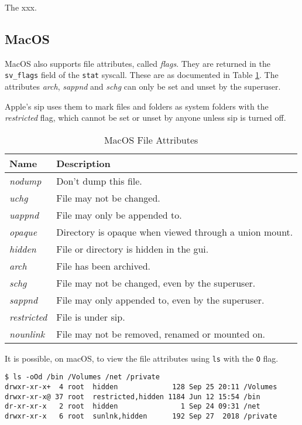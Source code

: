 \documentclass[a4paper]{article}
\begin{document}
The xxx.

\subsection{MacOS}


MacOS also supports file attributes, called \emph{flags}. They are returned in the \verb|sv_flags| field of the \verb|stat| syscall. These are as documented in Table \ref{tbl:macosflags}. The attributes \emph{arch}, \emph{sappnd} and \emph{schg} can only be set and unset by the superuser. 

Apple's \gls{sip} uses them to mark files and folders as system folders with the \emph{restricted} flag, which cannot be set or unset by anyone unless \gls{sip} is turned off.

\begin{table}
\centering\caption{MacOS File Attributes}\label{tbl:macosflags}
\begin{tabular}{@{}lp{10.5cm}@{}}
\toprule
Name & Description\\
\midrule
\emph{nodump} & Don't dump this file.\\
\emph{uchg} & File may not be changed.\\
\emph{uappnd} & File may only be appended to.\\
\emph{opaque} & Directory is opaque when viewed through a union mount.\\
\emph{hidden} & File or directory is hidden in the \gls{gui}.\\
\emph{arch} & File has been archived.\\
\emph{schg} & File may not be changed, even by the superuser.\\
\emph{sappnd} & File may only appended to, even by the superuser.\\
\emph{restricted} & File is under \gls{sip}.\\
\emph{nounlink} & File may not be removed, renamed or mounted on.\\
\bottomrule  
\end{tabular}
\end{table}
It is possible, on macOS, to view the file attributes using \verb|ls| with the \verb|O| flag. 

\begin{verbatim}
$ ls -oOd /bin /Volumes /net /private
drwxr-xr-x+  4 root  hidden             128 Sep 25 20:11 /Volumes
drwxr-xr-x@ 37 root  restricted,hidden 1184 Jun 12 15:54 /bin
dr-xr-xr-x   2 root  hidden               1 Sep 24 09:31 /net
drwxr-xr-x   6 root  sunlnk,hidden      192 Sep 27  2018 /private  
\end{verbatim}
\end{document}
